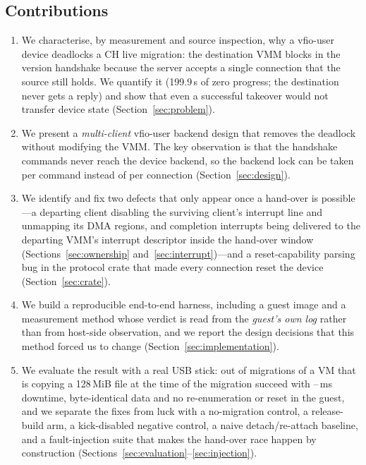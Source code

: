 \documentclass[10pt,conference]{IEEEtran}
\begin{document}
\subsection{Contributions}
\begin{enumerate}
  \item We characterise, by measurement and source inspection, why a
        vfio-user device deadlocks a CH live migration: the destination VMM
        blocks in the version handshake because the server accepts a single
        connection that the source still holds. We quantify it (199.9\,s of
        zero progress; the destination never gets a reply) and show that even a
        successful takeover would not transfer device state
        (Section~\ref{sec:problem}).
  \item We present a \emph{multi-client} vfio-user backend design that removes
        the deadlock without modifying the VMM. The key observation is that the
        handshake commands never reach the device backend, so the backend lock
        can be taken per command instead of per connection
        (Section~\ref{sec:design}).
  \item We identify and fix two defects that only appear once a hand-over is possible---a departing client disabling the surviving client's interrupt line and unmapping its DMA regions, and completion interrupts being delivered to the departing VMM's interrupt descriptor inside the hand-over window (Sections~\ref{sec:ownership} and~\ref{sec:interrupt})---and a reset-capability parsing bug in the protocol crate that made every connection reset the device (Section~\ref{sec:crate}).
  \item We build a reproducible end-to-end harness, including a guest image
        and a measurement method whose verdict is read from the \emph{guest's
        own log} rather than from host-side observation, and we report the
        design decisions that this method forced us to change
        (Section~\ref{sec:implementation}).
  \item We evaluate the result with a real USB stick: \PassCount{} out of
        \TotalRuns{} migrations of a VM that is copying a 128\,MiB file at the
        time of the migration succeed with \DowntimeMin--\DowntimeMax\,ms
        downtime, byte-identical data and no re-enumeration or reset in the
        guest, and we separate the fixes from luck with a no-migration control,
        a release-build arm, a kick-disabled negative control, a naive
        detach/re-attach baseline, and a fault-injection suite that makes the
        hand-over race happen by construction
        (Sections~\ref{sec:evaluation}--\ref{sec:injection}).
\end{enumerate}
\end{document}

